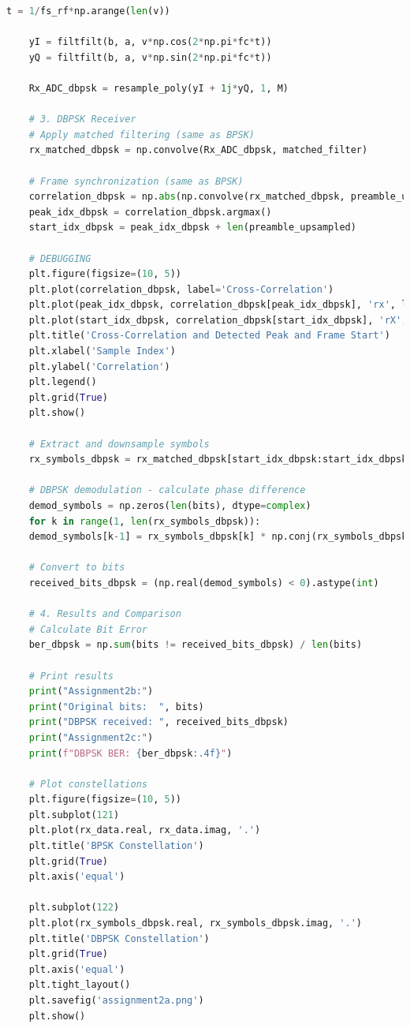 \documentclass[
	letterpaper, %
	10pt, %
]{CSUniSchoolLabReport}
\begin{document}
\begin{lstlisting}[language=Python]
	t = 1/fs_rf*np.arange(len(v))
	
	yI = filtfilt(b, a, v*np.cos(2*np.pi*fc*t))
	yQ = filtfilt(b, a, v*np.sin(2*np.pi*fc*t))
	
	Rx_ADC_dbpsk = resample_poly(yI + 1j*yQ, 1, M)
	
	# 3. DBPSK Receiver
	# Apply matched filtering (same as BPSK)
	rx_matched_dbpsk = np.convolve(Rx_ADC_dbpsk, matched_filter)
	
	# Frame synchronization (same as BPSK)
	correlation_dbpsk = np.abs(np.convolve(rx_matched_dbpsk, preamble_upsampled[::-1])) / len(preamble_upsampled)
	peak_idx_dbpsk = correlation_dbpsk.argmax()
	start_idx_dbpsk = peak_idx_dbpsk + len(preamble_upsampled)
	
	# DEBUGGING
	plt.figure(figsize=(10, 5))
	plt.plot(correlation_dbpsk, label='Cross-Correlation')
	plt.plot(peak_idx_dbpsk, correlation_dbpsk[peak_idx_dbpsk], 'rx', label=f'Peak={peak_idx_dbpsk}')
	plt.plot(start_idx_dbpsk, correlation_dbpsk[start_idx_dbpsk], 'rX', label=f'FrameStart={start_idx_dbpsk}')
	plt.title('Cross-Correlation and Detected Peak and Frame Start')
	plt.xlabel('Sample Index')
	plt.ylabel('Correlation')
	plt.legend()
	plt.grid(True)
	plt.show()
	
	# Extract and downsample symbols
	rx_symbols_dbpsk = rx_matched_dbpsk[start_idx_dbpsk:start_idx_dbpsk + num_data_symbols*sps + 1:sps]
	
	# DBPSK demodulation - calculate phase difference
	demod_symbols = np.zeros(len(bits), dtype=complex)
	for k in range(1, len(rx_symbols_dbpsk)):
	demod_symbols[k-1] = rx_symbols_dbpsk[k] * np.conj(rx_symbols_dbpsk[k-1])  # Phase difference
	
	# Convert to bits
	received_bits_dbpsk = (np.real(demod_symbols) < 0).astype(int)
	
	# 4. Results and Comparison
	# Calculate Bit Error
	ber_dbpsk = np.sum(bits != received_bits_dbpsk) / len(bits)
	
	# Print results
	print("Assignment2b:")
	print("Original bits:  ", bits)
	print("DBPSK received: ", received_bits_dbpsk)
	print("Assignment2c:")
	print(f"DBPSK BER: {ber_dbpsk:.4f}")
	
	# Plot constellations
	plt.figure(figsize=(10, 5))
	plt.subplot(121)
	plt.plot(rx_data.real, rx_data.imag, '.')
	plt.title('BPSK Constellation')
	plt.grid(True)
	plt.axis('equal')
	
	plt.subplot(122)
	plt.plot(rx_symbols_dbpsk.real, rx_symbols_dbpsk.imag, '.')
	plt.title('DBPSK Constellation')
	plt.grid(True)
	plt.axis('equal')
	plt.tight_layout()
	plt.savefig('assignment2a.png')
	plt.show()
\end{lstlisting}
\end{document}
